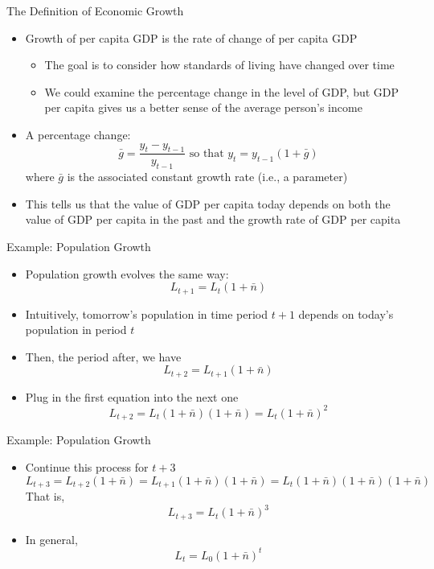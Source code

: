 \documentclass[aspectratio=1610]{beamer}
\begin{document}
\begin{frame}[wide]{The Definition of Economic Growth}
	\begin{itemize}
		\item Growth of per capita GDP is the rate of change of per capita GDP
		\begin{itemize}
			\item The goal is to consider how standards of living have changed over time
			\item We could examine the percentage change in the level of GDP, but GDP per capita gives us a better sense of the average person’s income
		\end{itemize}
		\item A percentage change: 
		\[\bar{g} = \frac{y_{t}-y_{t-1}}{y_{t-1}} \text{ so that } y_t = y_{t-1}(1+\bar{g})\]
		where  $\bar{g}$ is the associated constant growth rate (i.e., a parameter)
		
		\item This tells us that the value of GDP per capita today depends on both the value of GDP per capita in the past and the growth rate of GDP per capita
	\end{itemize}
\end{frame}

\begin{frame}[wide]{Example: Population Growth}
	\begin{itemize}
		\item Population growth evolves the same way:
		\[L_{t+1} = L_t (1+\bar{n})\]
		\item Intuitively, tomorrow’s population in time period $t+1$ depends on today's population in period $t$
		\item Then, the period after, we have 
		\[L_{t+2}=L_{t+1}(1+\bar{n})\]
		\item Plug in the first equation into the next one
		\[L_{t+2}=L_t (1+\bar{n})(1+\bar{n}) = L_t (1+\bar{n})^2\]
	\end{itemize}
\end{frame}

\begin{frame}[wide]{Example: Population Growth}
	\begin{itemize}
		\item Continue this process for $t+3$
		\[L_{t+3} = L_{t+2}(1+\bar{n}) =L_{t+1}(1+\bar{n}) (1+\bar{n}) = L_{t}(1+\bar{n}) (1+\bar{n})(1+\bar{n}) \]
		That is, 
		\[L_{t+3} = L_{t}(1+\bar{n})^3 \]
		\item In general, 
		\[L_t = L_0 (1+\bar{n})^t\]
	\end{itemize}
\end{frame}
\end{document}
